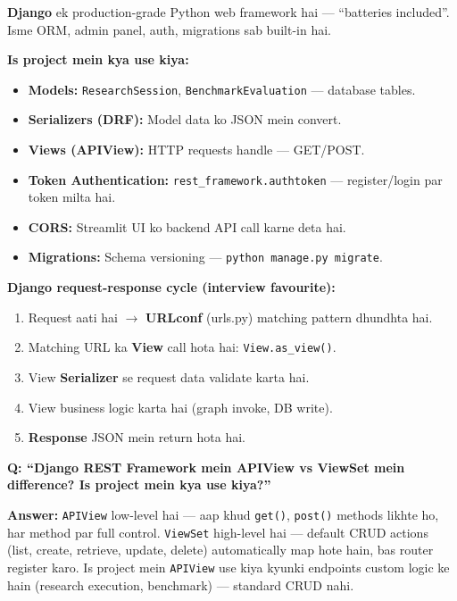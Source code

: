 \documentclass[11pt, a4paper]{article}
\begin{document}
\begin{conceptbox}
\textbf{Django} ek production-grade Python web framework hai --- ``batteries included''. Isme ORM, admin panel, auth, migrations sab built-in hai.

\textbf{Is project mein kya use kiya:}
\begin{itemize}
\item \textbf{Models:} \texttt{ResearchSession}, \texttt{BenchmarkEvaluation} --- database tables.
\item \textbf{Serializers (DRF):} Model data ko JSON mein convert.
\item \textbf{Views (APIView):} HTTP requests handle --- GET/POST.
\item \textbf{Token Authentication:} \texttt{rest\_framework.authtoken} --- register/login par token milta hai.
\item \textbf{CORS:} Streamlit UI ko backend API call karne deta hai.
\item \textbf{Migrations:} Schema versioning --- \texttt{python manage.py migrate}.
\end{itemize}
\end{conceptbox}

\begin{conceptbox}
\textbf{Django request-response cycle (interview favourite):}

\begin{enumerate}[label=\textcolor{accentpurple}{\arabic*.}]
\item Request aati hai $\rightarrow$ \textbf{URLconf} (urls.py) matching pattern dhundhta hai.
\item Matching URL ka \textbf{View} call hota hai: \texttt{View.as\_view()}.
\item View \textbf{Serializer} se request data validate karta hai.
\item View business logic karta hai (graph invoke, DB write).
\item \textbf{Response} JSON mein return hota hai.
\end{enumerate}
\end{conceptbox}

\begin{interviewbox}
\textbf{Q: ``Django REST Framework mein APIView vs ViewSet mein difference? Is project mein kya use kiya?''}

\textbf{Answer:} \texttt{APIView} low-level hai --- aap khud \texttt{get()}, \texttt{post()} methods likhte ho, har method par full control. \texttt{ViewSet} high-level hai --- default CRUD actions (list, create, retrieve, update, delete) automatically map hote hain, bas router register karo. Is project mein \texttt{APIView} use kiya kyunki endpoints custom logic ke hain (research execution, benchmark) --- standard CRUD nahi.
\end{interviewbox}
\end{document}
